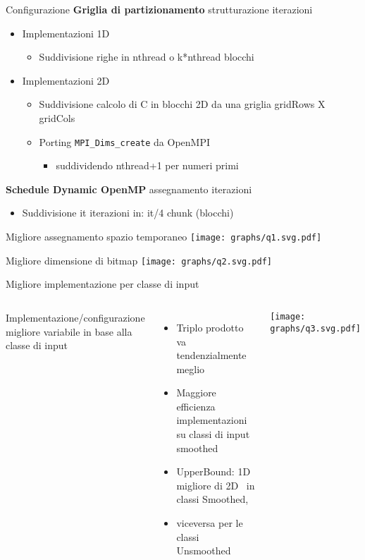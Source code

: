 \begin{frame} {Configurazione}
{\bf Griglia di partizionamento}	\quad strutturazione iterazioni
\begin{itemize}
	\item Implementazioni 1D
	\begin{itemize}
		\item Suddivisione righe in nthread o k*nthread blocchi
	\end{itemize}
	\item Implementazioni 2D
	\begin{itemize}
		\item Suddivisione calcolo di C in blocchi 2D
		da una griglia gridRows X gridCols
		\item Porting \verb|MPI_Dims_create| da OpenMPI
		\begin{itemize}
			\item suddividendo nthread+1 per numeri primi
		\end{itemize}
	\end{itemize}
\end{itemize}
\voidLine
{\bf Schedule Dynamic OpenMP}	\quad assegnamento iterazioni
\begin{itemize}
	\item	Suddivisione it iterazioni in: it/4 chunk (blocchi)
\end{itemize}
\end{frame}

\begin{frame} {Migliore assegnamento spazio temporaneo}
	\texttt{[image: graphs/q1.svg.pdf]}
\end{frame}
\begin{frame} {Migliore dimensione di bitmap}
	\texttt{[image: graphs/q2.svg.pdf]}
\end{frame}

\begin{frame} {Migliore implementazione per classe di input}
\begin{columns}
	Implementazione/configurazione migliore
	variabile in base alla classe di input
	
	\begin{itemize}
		\item	Triplo prodotto va tendenzialmente meglio
		\item	Maggiore efficienza implementazioni
		su classi di input smoothed
		\item	UpperBound: 1D migliore di 2D 
		in classi Smoothed, 
		\item	viceversa per le classi Unsmoothed
	\end{itemize}
	
	\texttt{[image: graphs/q3.svg.pdf]}
\end{columns}
\end{frame}

